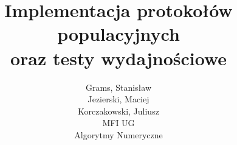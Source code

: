 \usepackage{graphicx}
\usepackage{comment}
\usepackage[font=scriptsize]{caption}
\usepackage{subcaption} 


 
\newenvironment{theorem}[2][Twierdzenie]{\begin{trivlist}
\item[\hskip \labelsep {\bfseries #1}\hskip \labelsep {\bfseries #2.}]}{\end{trivlist}}
\newenvironment{question}[2][Pytanie]{\begin{trivlist}
\item[\hskip \labelsep {\bfseries #1}\hskip \labelsep {\bfseries #2.}]}{\end{trivlist}}
\newenvironment{hypothesis}[2][Hipoteza]{\begin{trivlist}
\item[\hskip \labelsep {\bfseries #1}\hskip \labelsep {\bfseries #2.}]}{\end{trivlist}}
\newenvironment{lemma}[2][Lemat]{\begin{trivlist}
\item[\hskip \labelsep {\bfseries #1}\hskip \labelsep {\bfseries #2.}]}{\end{trivlist}}
\newenvironment{exercise}[2][Ćwiczenie]{\begin{trivlist}
\item[\hskip \labelsep {\bfseries #1}\hskip \labelsep {\bfseries #2.}]}{\end{trivlist}}
\newenvironment{reflection}[2][Uwaga]{\begin{trivlist}
\item[\hskip \labelsep {\bfseries #1}\hskip \labelsep {\bfseries #2.}]}{\end{trivlist}}
\newenvironment{proposition}[2][Założenie]{\begin{trivlist}
\item[\hskip \labelsep {\bfseries #1}\hskip \labelsep {\bfseries #2.}]}{\end{trivlist}}
\newenvironment{corollary}[2][Wniosek]{\begin{trivlist}
\item[\hskip \labelsep {\bfseries #1}\hskip \labelsep {\bfseries #2.}]}{\end{trivlist}}



\title{Implementacja protokołów populacyjnych\\oraz testy wydajnościowe}
\author{Grams, Stanisław\\Jezierski, Maciej\\Korczakowski, Juliusz\\ MFI UG\\Algorytmy Numeryczne}

